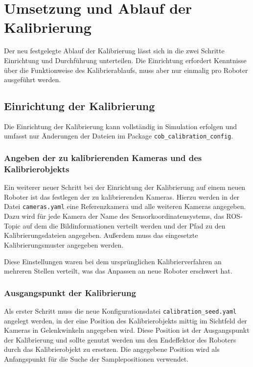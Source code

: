 \chapter{Umsetzung und Ablauf der Kalibrierung}

Der neu festgelegte Ablauf der Kalibrierung lässt sich in die zwei Schritte 
Einrichtung und Durchführung unterteilen. Die Einrichtung erfordert Kenntnisse
über die Funktionweise des Kalibrierablaufs, muss aber nur einmalig pro Roboter
ausgeführt werden.

\section{Einrichtung der Kalibrierung}
\label{sec:Einrichtung der Kalibrierung}

Die Einrichtung der Kalibrierung kann vollständig in Simulation erfolgen und 
umfasst nur Änderungen der Dateien im Package \texttt{cob\_calibration\_config}. 


\subsection{Angeben der zu kalibrierenden Kameras und des Kalibrierobjekts}
\label{sub:Angeben der zu kalibrierenden Kameras}

Ein weiterer neuer Schritt bei der Einrichtung der Kalibrierung auf einem neuen
Roboter ist das festlegen der zu kalibrierenden Kameras. Hierzu werden in der 
Datei \texttt{cameras.yaml} eine Referenzkamera und alle weiteren Kameras angegeben.
Dazu wird für jede Kamera der Name des Sensorkoordinatensystems, das
\ac{ROS}-Topic auf dem die Bildinformationen verteilt werden und der Pfad zu den
Kalibrierungsdateien angegeben. Außerdem muss das eingesetzte Kalibrierungsmuster
angegeben werden. 

Diese Einstellungen waren bei dem ursprünglichen Kalibrierverfahren an mehreren 
Stellen verteilt, was das Anpassen an neue Roboter erschwert hat.
\subsection{Ausgangspunkt der Kalibrierung}
\label{sub:Ausgangspunkt der Kalibrierung}

Als
erster Schritt muss die neue Konfigurationsdatei \texttt{calibration\_seed.yaml} 
angelegt werden, in der eine Position des Kalibrierobjekts mittig im Sichtfeld
der Kameras in Gelenkwinkeln angegeben wird. Diese Position ist der Ausgangspunkt
der Kalibrierung und sollte genutzt werden um den Endeffektor des Roboters durch 
das Kalibrierobjekt zu ersetzen. Die angegebene Position wird als Anfangspunkt 
für die Suche der Samplepositionen verwendet.

